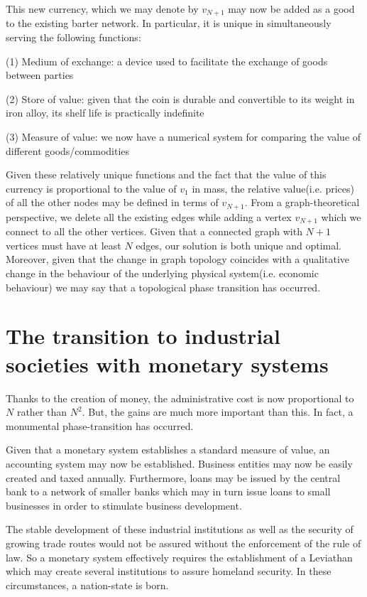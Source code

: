 \documentclass{article}
\begin{document}
This new currency, which we may denote by $v_{N+1}$ may now be added as a good to the existing
barter network. In particular, it is unique in simultaneously serving the following functions:

(1) Medium of exchange: a device used to facilitate the exchange of goods between parties

(2) Store of value: given that the coin is durable and convertible to its weight in iron alloy, its shelf life is practically indefinite

(3) Measure of value: we now have a numerical system for comparing the value of different goods/commodities

Given these relatively unique functions and the fact that the value of this currency is proportional to the value of $v_1$ in mass, the relative value(i.e. prices) of all the other nodes may be defined in terms of $v_{N+1}$. From a graph-theoretical perspective, we delete
all the existing edges while adding a vertex $v_{N+1}$ which we connect to all the other
vertices. Given that a connected graph with $N+1$ vertices must have at least $N$ edges,
our solution is both unique and optimal. Moreover, given that the change in graph topology coincides with a qualitative change in the behaviour of the underlying physical system(i.e. economic behaviour)
we may say that a topological phase transition has occurred.

\newpage

\section{The transition to industrial societies with monetary systems}

Thanks to the creation of money, the administrative cost is now proportional to $N$ rather than
$N^2$. But, the gains are much more important than this. In fact, a monumental phase-transition
has occurred.

Given that a monetary system establishes a standard measure of value, an accounting system may
now be established. Business entities may now be easily created and taxed annually. Furthermore,
loans may be issued by the central bank to a network of smaller banks which may in turn issue
loans to small businesses in order to stimulate business development.

The stable development of these industrial institutions as well as the security of growing
trade routes would not be assured without the enforcement of the rule of law. So a monetary
system effectively requires the establishment of a Leviathan which may create several institutions
to assure homeland security. In these circumstances, a nation-state is born.
\end{document}
